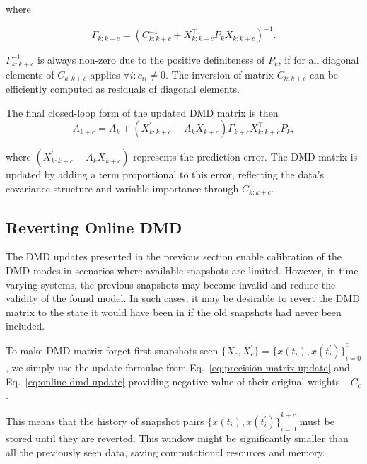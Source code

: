 where

\begin{equation}
	\Gamma_{k : k + c} = {(C_{k : k + c}^{-1} + X_{k : k + c}^\top P_k X_{k : k + c})}^{-1}.
\end{equation}

\(\Gamma_{k : k + c}^{-1}\) is always non-zero due to the positive definiteness of \(P_k\), if for all diagonal elements of \(C_{k : k + c}\) applies \( \forall i : c_{ii} \neq 0 \). The inversion of matrix \(C_{k: k + c}\) can be efficiently computed as residuals of diagonal elements.

The final closed-loop form of the updated DMD matrix is then
\begin{equation}\label{eq:online-dmd-update}
	A_{k+c} = A_k + (X^\prime_{k : k+c} - A_k X_{k+c}) \Gamma_{k+c} X_{k : k+c}^\top P_k,
\end{equation}

where \((X^\prime_{k : k+c} - A_k X_{k+c})\) represents the prediction error. The DMD matrix is updated by adding a term proportional to this error, reflecting the data's covariance structure and variable importance through \(C_{k : k + c}\).

\subsection{Reverting Online DMD}
The DMD updates presented in the previous section enable calibration of the DMD modes in scenarios where available snapshots are limited. However, in time-varying systems, the previous snapshots may become invalid and reduce the validity of the found model. In such cases, it may be desirable to revert the DMD matrix to the state it would have been in if the old snapshots had never been included.

To make DMD matrix forget first snapshots seen \( \{X_{c}, X^\prime_{c}\} = {\{x(t_i), x(t_i^\prime )\}}^c_{i=0}\), we simply use the update formulae from Eq.~\eqref{eq:precision-matrix-update} and Eq.~\eqref{eq:online-dmd-update} providing negative value of their original weights \(-C_{c}\).

This means that the history of snapshot pairs \({\{x(t_i), x(t_i^\prime )\}}^{k+c}_{i=0}\) must be stored until they are reverted. This window might be significantly smaller than all the previously seen data, saving computational resources and memory.


